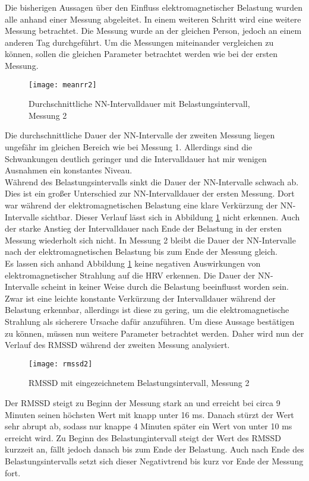 Die bisherigen Aussagen über den Einfluss elektromagnetischer Belastung wurden alle anhand einer Messung abgeleitet. In einem weiteren Schritt wird eine weitere Messung betrachtet. Die Messung wurde an der gleichen Person, jedoch an einem anderen Tag durchgeführt. Um die Messungen miteinander vergleichen zu können, sollen die gleichen Parameter betrachtet werden wie bei der ersten Messung.
\begin{figure}[H]
	\centering
	\texttt{[image: meanrr2]}
	\caption{Durchschnittliche NN-Intervalldauer mit Belastungsintervall, Messung 2}
	\label{fig:meanrr2}
\end{figure}
Die durchschnittliche Dauer der NN-Intervalle der zweiten Messung liegen ungefähr im gleichen Bereich wie bei Messung 1. Allerdings sind die Schwankungen deutlich geringer und die Intervalldauer hat mir wenigen Ausnahmen ein konstantes Niveau. \\
Während des Belastungsintervalls sinkt die Dauer der NN-Intervalle schwach ab. Dies ist ein großer Unterschied zur NN-Intervalldauer der ersten Messung. Dort war während der elektromagnetischen Belastung eine klare Verkürzung der NN-Intervalle sichtbar. Dieser Verlauf lässt sich in Abbildung \ref{fig:meanrr2} nicht erkennen. Auch der starke Anstieg der Intervalldauer nach Ende der Belastung  in der ersten Messung wiederholt sich nicht. In Messung 2 bleibt die Dauer der NN-Intervalle nach der elektromagnetischen Belastung bis zum Ende der Messung gleich.\\
Es lassen sich anhand Abbildung \ref{fig:meanrr2} keine negativen Auswirkungen von elektromagnetischer Strahlung auf die HRV erkennen. Die Dauer der NN-Intervalle scheint in keiner Weise durch die Belastung beeinflusst worden sein. Zwar ist eine leichte konstante Verkürzung der Intervalldauer während der Belastung erkennbar, allerdings ist diese zu gering, um die elektromagnetische Strahlung als sicherere Ursache dafür anzuführen. Um diese Aussage bestätigen zu können, müssen nun weitere Parameter betrachtet werden. Daher wird nun der Verlauf des RMSSD während der zweiten Messung analysiert.
\begin{figure}[H]
	\centering
	\texttt{[image: rmssd2]}
	\caption{RMSSD mit eingezeichnetem Belastungsintervall, Messung 2}
	\label{fig:rmssd2}
\end{figure}
Der RMSSD steigt zu Beginn der Messung stark an und erreicht bei circa 9 Minuten seinen höchsten Wert mit knapp unter 16 ms. Danach stürzt der Wert sehr abrupt ab, sodass nur knappe 4 Minuten später ein Wert von unter 10 ms erreicht wird. Zu Beginn des Belastungintervall steigt der Wert des RMSSD kurzzeit an, fällt jedoch danach bis zum Ende der Belastung. Auch nach Ende des Belastungsintervalls setzt sich dieser Negativtrend bis kurz vor Ende der Messung fort.\\
